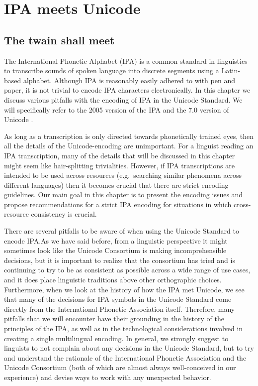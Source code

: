 \chapter{IPA meets Unicode}
\label{ipa-meets-unicode}

\section{The twain shall meet}

The International Phonetic Alphabet (IPA) is a common standard in linguistics to
transcribe sounds of spoken language into discrete segments using a Latin-based
alphabet. Although IPA is reasonably easily adhered to with pen and paper, it is
not trivial to encode IPA characters electronically. In this chapter we discuss
various pitfalls with the encoding of IPA in the Unicode Standard. We will
specifically refer to the 2005 version of the IPA \citep{IPA2005} and the 7.0
version of Unicode \citep{Unicode2014}.

As long as a transcription is only directed towards phonetically trained eyes,
then all the details of the Unicode-encoding are unimportant. For a linguist
reading an IPA transcription, many of the details that will be discussed in this
chapter might seem like hair-splitting trivialities. However, if IPA
transcriptions are intended to be used across resources (e.g.~searching similar
phenomena across different languages) then it becomes crucial that there are
strict encoding guidelines. Our main goal in this chapter is to present the
encoding issues and propose recommendations for a strict IPA encoding for
situations in which cross-resource consistency is crucial.

There are several pitfalls to be aware of when using the Unicode Standard to
encode IPA.\@ As we have said before, from a linguistic perspective it might
sometimes look like the Unicode Consortium is making incomprehensible decisions,
but it is important to realize that the consortium has tried and is continuing
to try to be as consistent as possible across a wide range of use cases, and it
does place linguistic traditions above other orthographic choices. Furthermore,
when we look at the history of how the IPA met Unicode, we see that many of the
decisions for IPA symbols in the Unicode Standard come directly from the
International Phonetic Association itself. Therefore, many pitfalls that we will
encounter have their grounding in the history of the principles of the IPA, as
well as in the technological considerations involved in creating a single
multilingual encoding. In general, we strongly suggest to linguists to not
complain about any decisions in the Unicode Standard, but to try and understand
the rationale of the International Phonetic Association and the Unicode
Consortium (both of which are almost always well-conceived in our experience)
and devise ways to work with any unexpected behavior.

